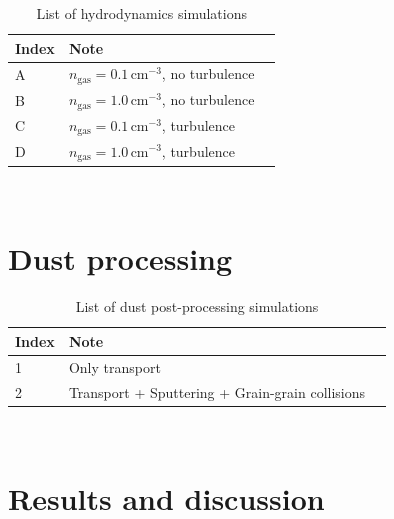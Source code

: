 \documentclass[fleqn,usenatbib]{mnras}
\begin{document}
 \begin{table}
 \centering
 \caption{List of hydrodynamics simulations}
 \begin{tabular}{ l l l}
 \hline\hline
 Index&Note&\\\hline 
 A&$n_\text{gas}=0.1\,\text{cm}^{-3}$, no turbulence&\\\hline  
 B&$n_\text{gas}=1.0\,\text{cm}^{-3}$, no turbulence&\\\hline   
 C&$n_\text{gas}=0.1\,\text{cm}^{-3}$, turbulence&\\\hline  
 D&$n_\text{gas}=1.0\,\text{cm}^{-3}$, turbulence&\\\hline   
 \end{tabular}
 \label{List_hydrosimulations}
 \end{table}

\newpage~
\newpage
\section{Dust processing}
 \begin{table}
 \centering
 \caption{List of dust post-processing simulations}
 \begin{tabular}{ l l l}
 \hline\hline
 Index&Note&\\\hline 
 1&Only transport&\\\hline  
 2&Transport + Sputtering + Grain-grain collisions&\\\hline 
 \end{tabular}
 \label{List_Dustsimulations}
 \end{table}
 
\newpage~
\newpage
\section{Results and discussion}
\end{document}
